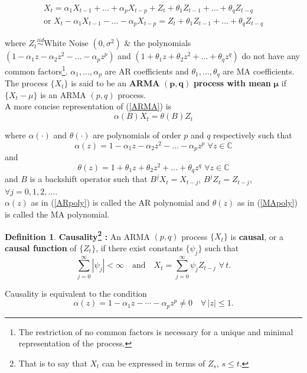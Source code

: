 \documentclass[11pt, a4paper]{article}
\numberwithin{equation}{section}
\theoremstyle{definition}
\newtheorem{definition}{Definition}[section]
\begin{document}
\begin{align}\label{ARMA}
X_t = \alpha_1 X_{t-1} + \ldots + \alpha_p X_{t-p} + Z_t + \theta_1 Z_{t-1} + \ldots + \theta_q Z_{t-q} \nonumber \\[0.5em]
\text{or } X_t - \alpha_1 X_{t-1} - \ldots - \alpha_p X_{t-p} = Z_t + \theta_1 Z_{t-1} + \ldots + \theta_q Z_{t-q}
\end{align}

where $Z_t \overset{iid}{\sim} \text{White Noise }(0, \sigma^2)$ \& the polynomials $(1 - \alpha_1 z - \alpha_2 z^2 - \ldots - \alpha_p z^p)$ and $(1 + \theta_1 z + \theta_2 z^2 + \ldots + \theta_q z^q)$ do not have any common factors\footnote{The restriction of no common factors is necessary for a unique and minimal representation of the process.}. $\alpha_1, \ldots, \alpha_p$ are AR coefficients and $\theta_1, \ldots, \theta_q$ are MA coefficients. \\[0.5em]

The process $\{X_t\}$ is said to be an \textbf{ARMA} $\boldsymbol{(p,q)}$ \textbf{process with mean} $\boldsymbol{\mu}$ if $\{X_t - \mu\}$ is an ARMA $(p,q)$ process. \\[0.5em]

A more concise representation of (\ref{ARMA}) is
\begin{equation}\label{ARMAbackshift}
\alpha(B) X_t = \theta(B) Z_t
\end{equation}

where $\alpha(\cdot)$ and $\theta(\cdot)$ are polynomials of order $p$ and $q$ respectively such that
\begin{equation}\label{ARpoly}
\alpha(z) = 1 - \alpha_1 z - \alpha_2 z^2 - \ldots - \alpha_p z^p \,\, \forall z \in \mathbb{C}
\end{equation}
and
\begin{equation}\label{MApoly}
\theta(z) = 1 + \theta_1 z + \theta_2 z^2 + \ldots + \theta_q z^q \,\, \forall z \in \mathbb{C}
\end{equation}
and $B$ is a backshift operator such that $B^j X_t = X_{t-j}$, $B^j Z_t = Z_{t-j}$, $\forall j = 0, 1, 2, \ldots$. \\[0.5em]

$\alpha(z)$ as in (\ref{ARpoly}) is called the AR polynomial and $\theta(z)$ as in (\ref{MApoly}) is called the MA polynomial.

\vspace{0.4cm}

\begin{definition}
\textbf{Causality\footnote{That is to say that $X_t$ can be expressed in terms of $Z_s$, $s \leq t$.} :} An ARMA $(p,q)$ process $\{X_t\}$ is \textbf{causal}, or a \textbf{causal function} of $\{Z_t\}$, if there
exist constants $\{\psi_j\}$ such that 
$$\sum \limits_{j=0}^{\infty} |\psi_j| < \infty \quad \text{and} \quad X_t = \sum \limits_{j=0}^{\infty} \psi_j Z_{t-j} \,\, \forall \, t.$$

Causality is equivalent to the condition
$$\alpha(z) = 1 - \alpha_1 z - \cdots - \alpha_p z^p \neq 0 
\quad \forall \, |z| \leq 1.$$
\end{definition}
\end{document}
